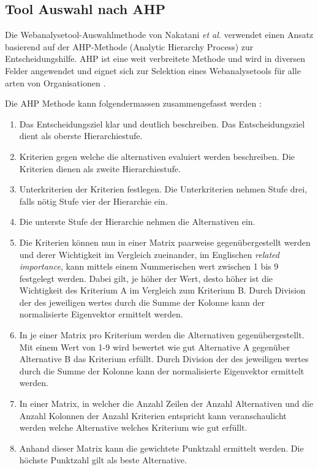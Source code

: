 \subsection{Tool Auswahl nach AHP}

Die Webanalysetool-Auswahlmethode von Nakatani \textit{et al.} \parencite{nakatani2011toolselectionmethod} verwendet einen Ansatz basierend auf der AHP-Methode (Analytic Hierarchy Process) zur Entscheidungshilfe. AHP ist eine weit verbreitete Methode und wird in diversen Felder angewendet und eignet sich zur Selektion eines Webanalysetools für alle arten von Organisationen \parencite[S. 176]{nakatani2011toolselectionmethod}. 

Die AHP Methode kann folgendermassen zusammengefasst werden \parencite[S. 176]{nakatani2011toolselectionmethod}:

\begin{enumerate}
  \item Das Entscheidungsziel klar und deutlich beschreiben. Das Entscheidungsziel dient als oberste Hierarchiestufe.
  \item Kriterien gegen welche die alternativen evaluiert werden beschreiben. Die Kriterien dienen als zweite Hierarchiestufe.
  \item Unterkriterien der Kriterien festlegen. Die Unterkriterien nehmen Stufe drei, falls nötig Stufe vier der Hierarchie ein.
  \item Die unterste Stufe der Hierarchie nehmen die Alternativen ein.
  \item Die Kriterien können nun in einer Matrix paarweise gegenübergestellt werden und derer Wichtigkeit im Vergleich zueinander, im Englischen \textit{related importance}, kann mittels einem Nummerischen wert zwischen 1 bis 9 festgelegt werden. Dabei gilt, je höher der Wert, desto höher ist die Wichtigkeit des Kriterium A im Vergleich zum Kriterium B. Durch Division der des jeweiligen wertes durch die Summe der Kolonne kann der normalisierte Eigenvektor ermittelt werden.
  \item In je einer Matrix pro Kriterium werden die Alternativen gegenübergestellt. Mit einem Wert von 1-9 wird bewertet wie gut Alternative A gegenüber Alternative B das Kriterium erfüllt. Durch Division der des jeweiligen wertes durch die Summe der Kolonne kann der normalisierte Eigenvektor ermittelt werden.
  \item In einer Matrix, in welcher die Anzahl Zeilen der Anzahl Alternativen und die Anzahl Kolonnen der Anzahl Kriterien entspricht kann veranschaulicht werden welche Alternative welches Kriterium wie gut erfüllt.
  \item Anhand dieser Matrix kann die gewichtete Punktzahl ermittelt werden. Die höchste Punktzahl gilt als beste Alternative.
\end{enumerate}

